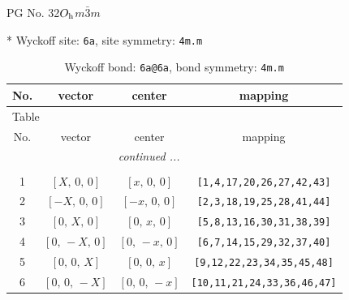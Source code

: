 \documentclass[fleqn,8pt]{jsarticle}
\begin{document}
\setcounter{MaxMatrixCols}{32}

\renewcommand{\tablename}{Table~}
\renewcommand{\figurename}{Figure~}
\begin{center}
\LARGE
PG No. 32\quad$O_{\rm h}$\quad$m\bar{3}m$\quad[ cubic ]
\end{center}


* Wyckoff site: {\tt 6a}, site symmetry: {\tt 4m.m}
\renewcommand{\arraystretch}{1.2}
\begin{longtable}{cccc}
\caption{Wyckoff bond: {\tt 6a@6a}, bond symmetry: {\tt 4m.m}}
 \\
 \hline \hline
No. & vector & center & mapping \\ \hline \endfirsthead

\multicolumn{3}{l}{\tablename\ \thetable{}} \\
 \hline \hline
No. & vector & center & mapping \\ \hline \endhead

 \hline \hline
\multicolumn{3}{r}{\footnotesize\it continued ...} \\ \endfoot

 \hline \hline
\multicolumn{3}{r}{} \\ \endlastfoot

1 & $\left[ X,\, 0,\, 0 \right]$ & $\left[ x,\, 0,\, 0 \right]$ & {\tt [1,4,17,20,26,27,42,43]} \\ \hline
2 & $\left[ - X,\, 0,\, 0 \right]$ & $\left[ - x,\, 0,\, 0 \right]$ & {\tt [2,3,18,19,25,28,41,44]} \\ \hline
3 & $\left[ 0,\, X,\, 0 \right]$ & $\left[ 0,\, x,\, 0 \right]$ & {\tt [5,8,13,16,30,31,38,39]} \\ \hline
4 & $\left[ 0,\, - X,\, 0 \right]$ & $\left[ 0,\, - x,\, 0 \right]$ & {\tt [6,7,14,15,29,32,37,40]} \\ \hline
5 & $\left[ 0,\, 0,\, X \right]$ & $\left[ 0,\, 0,\, x \right]$ & {\tt [9,12,22,23,34,35,45,48]} \\ \hline
6 & $\left[ 0,\, 0,\, - X \right]$ & $\left[ 0,\, 0,\, - x \right]$ & {\tt [10,11,21,24,33,36,46,47]} \\
\end{longtable}
\renewcommand{\arraystretch}{1.2}
\end{document}
